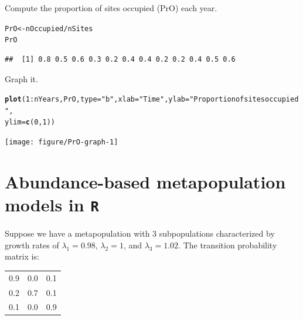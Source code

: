 \documentclass[12pt]{article}\usepackage[]{graphicx}\usepackage[]{xcolor}
\makeatletter
\newcommand{\hlnum}[1]{\textcolor[rgb]{0.686,0.059,0.569}{#1}}%
\newcommand{\hlsng}[1]{\textcolor[rgb]{0.192,0.494,0.8}{#1}}%
\newcommand{\hlopt}[1]{\textcolor[rgb]{0,0,0}{#1}}%
\newcommand{\hldef}[1]{\textcolor[rgb]{0.345,0.345,0.345}{#1}}%
\newcommand{\hlkwb}[1]{\textcolor[rgb]{0.69,0.353,0.396}{#1}}%
\newcommand{\hlkwc}[1]{\textcolor[rgb]{0.333,0.667,0.333}{#1}}%
\newcommand{\hlkwd}[1]{\textcolor[rgb]{0.737,0.353,0.396}{\textbf{#1}}}%
\newenvironment{kframe}{%
 \def\at@end@of@kframe{}%
 \ifinner\ifhmode%
  \def\at@end@of@kframe{\end{minipage}}%
  \begin{minipage}{\columnwidth}%
 \fi\fi%
 \def\FrameCommand##1{\hskip\@totalleftmargin \hskip-\fboxsep
 \colorbox{shadecolor}{##1}\hskip-\fboxsep
     \hskip-\linewidth \hskip-\@totalleftmargin \hskip\columnwidth}%
 \MakeFramed {\advance\hsize-\width
   \@totalleftmargin\z@ \linewidth\hsize
   \@setminipage}}%
 {\par\unskip\endMakeFramed%
 \at@end@of@kframe}
\newenvironment{knitrout}{}{} %
\makeatother
\begin{document}
\clearpage

Compute the proportion of sites occupied (PrO) each year.
\begin{knitrout}
\color{fgcolor}\begin{kframe}
\begin{alltt}
\hldef{PrO} \hlkwb{<-} \hldef{nOccupied} \hlopt{/} \hldef{nSites}
\hldef{PrO}
\end{alltt}
\begin{verbatim}
##  [1] 0.8 0.5 0.6 0.3 0.2 0.4 0.4 0.2 0.2 0.4 0.5 0.6
\end{verbatim}
\end{kframe}
\end{knitrout}

Graph it.
\begin{knitrout}
\color{fgcolor}\begin{kframe}
\begin{alltt}
\hlkwd{plot}\hldef{(}\hlnum{1}\hlopt{:}\hldef{nYears, PrO,} \hlkwc{type}\hldef{=}\hlsng{"b"}\hldef{,} \hlkwc{xlab}\hldef{=}\hlsng{"Time"}\hldef{,} \hlkwc{ylab}\hldef{=}\hlsng{"Proportion of sites occupied"}\hldef{,}
     \hlkwc{ylim}\hldef{=}\hlkwd{c}\hldef{(}\hlnum{0}\hldef{,} \hlnum{1}\hldef{))}
\end{alltt}
\end{kframe}
\texttt{[image: figure/PrO-graph-1]} 
\end{knitrout}


\clearpage

\section*{Abundance-based metapopulation models in \texttt{R}}

Suppose we have a metapopulation with 3 subpopulations characterized
by growth rates of $\lambda_1=0.98$, $\lambda_2=1$, and
$\lambda_3=1.02$. The transition probability matrix is:

\begin{table}[h!]
  \centering
  \begin{tabular}{ccc}
    \hline
    0.9 & 0.0 & 0.1 \\
    0.2 & 0.7 & 0.1 \\
    0.1 & 0.0 & 0.9 \\
    \hline
  \end{tabular}
\end{table}
\end{document}
